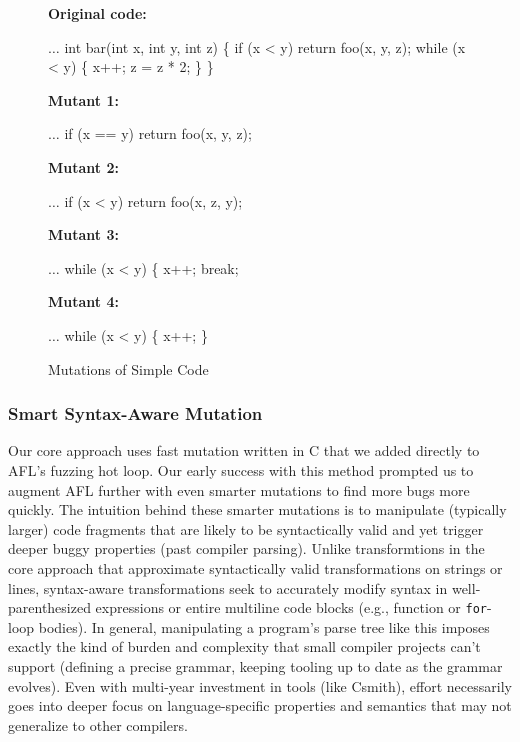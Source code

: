 \begin{figure}
  \raggedright
  {\scriptsize
    {\bf Original code:}
\begin{code}
$\ldots$      
 int bar(int x, int y, int z) \{
   if (x < y)
      return foo(x, y, z);
   while (x < y) \{
      x++;
      z = z * 2;
   \}
\}
\end{code}
   {\bf Mutant 1:}
\begin{code}
$\ldots$      
   if (x == y)
      return foo(x, y, z);
\end{code}
   {\bf Mutant 2:}
\begin{code}
$\ldots$      
   if (x < y)
      return foo(x, z, y);
\end{code}
   {\bf Mutant 3:}
\begin{code}
$\ldots$      
   while (x < y) \{
      x++;
      break;
    \end{code}
   {\bf Mutant 4:}
\begin{code}
$\ldots$      
   while (x < y) \{
     x++;
   \}
 \end{code}

}
\caption{Mutations of  Simple Code}
\label{fig:fopexample}
\end{figure}

\subsubsection{Smart Syntax-Aware Mutation}
\label{strat-syntax-aware}

\begin{sloppypar}
Our core approach uses fast mutation written in C that we added directly to
AFL's fuzzing hot loop. Our early success with this method prompted us to
augment AFL further with even smarter mutations to find more bugs more quickly.
The intuition behind these smarter mutations is to manipulate (typically
larger) code fragments that are likely to be syntactically valid and yet
trigger deeper buggy properties (past compiler parsing). Unlike transformtions
in the core approach that approximate syntactically valid transformations on
strings or lines, syntax-aware transformations seek to accurately modify syntax
in well-parenthesized expressions or entire multiline code blocks (e.g.,
function or \texttt{for}-loop bodies). In general, manipulating a program's
parse tree like this imposes exactly the kind of burden and complexity that
small compiler projects can't support (defining a precise grammar, keeping
tooling up to date as the grammar evolves). Even with multi-year investment in
tools (like Csmith), effort necessarily goes into deeper focus on
language-specific properties and semantics %
that may not generalize to other compilers.
\end{sloppypar}

